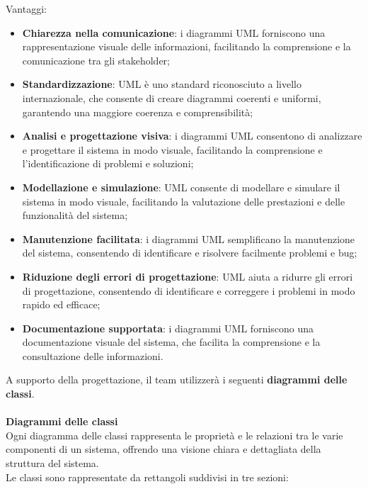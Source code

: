 Vantaggi:
\begin{itemize}
	\item \textbf{Chiarezza nella comunicazione}: i diagrammi UML forniscono una rappresentazione visuale delle informazioni, facilitando la comprensione e la comunicazione tra gli stakeholder;
	\item \textbf{Standardizzazione}: UML è uno standard riconosciuto a livello internazionale, che consente di creare diagrammi coerenti e uniformi, garantendo una maggiore coerenza e comprensibilità;
	\item \textbf{Analisi e progettazione visiva}: i diagrammi UML consentono di analizzare e progettare il sistema in modo visuale, facilitando la comprensione e l'identificazione di problemi e soluzioni;
	\item \textbf{Modellazione e simulazione}: UML consente di modellare e simulare il sistema in modo visuale, facilitando la valutazione delle prestazioni e delle funzionalità del sistema;
	\item \textbf{Manutenzione facilitata}: i diagrammi UML semplificano la manutenzione del sistema, consentendo di identificare e risolvere facilmente problemi e bug;
	\item \textbf{Riduzione degli errori di progettazione}: UML aiuta a ridurre gli errori di progettazione, consentendo di identificare e correggere i problemi in modo rapido ed efficace;
	\item \textbf{Documentazione supportata}: i diagrammi UML forniscono una documentazione visuale del sistema, che facilita la comprensione e la consultazione delle informazioni.
\end{itemize}
A supporto della progettazione, il team utilizzerà i seguenti \textbf{diagrammi delle classi}.
\\\\
\textbf{Diagrammi delle classi}\\
Ogni diagramma delle classi rappresenta le proprietà e le relazioni tra le varie componenti di un sistema, offrendo una visione chiara e dettagliata della struttura del sistema.\\
Le classi sono rappresentate da rettangoli suddivisi in tre sezioni:
